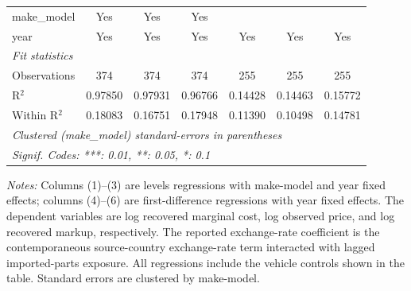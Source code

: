 \begin{table}[htbp]
{\begin{tabular}{lcccccc}
      make\_model               & Yes            & Yes           & Yes             &               &               & \\
      year                      & Yes            & Yes           & Yes             & Yes           & Yes           & Yes\\
      \midrule
      \emph{Fit statistics}\\
      Observations              & 374            & 374           & 374             & 255           & 255           & 255\\
      R$^2$                     & 0.97850        & 0.97931       & 0.96766         & 0.14428       & 0.14463       & 0.15772\\
      Within R$^2$              & 0.18083        & 0.16751       & 0.17948         & 0.11390       & 0.10498       & 0.14781\\
      \midrule \midrule
      \multicolumn{7}{l}{\emph{Clustered (make\_model) standard-errors in parentheses}}\\
      \multicolumn{7}{l}{\emph{Signif. Codes: ***: 0.01, **: 0.05, *: 0.1}}\\
   \end{tabular}%
   }
\vspace{0.25em}
\begin{minipage}{0.96\textwidth}
\footnotesize \textit{Notes:} Columns (1)--(3) are levels regressions with make-model and year fixed effects; columns (4)--(6) are first-difference regressions with year fixed effects. The dependent variables are log recovered marginal cost, log observed price, and log recovered markup, respectively. The reported exchange-rate coefficient is the contemporaneous source-country exchange-rate term interacted with lagged imported-parts exposure. All regressions include the vehicle controls shown in the table. Standard errors are clustered by make-model.
\end{minipage}
\end{table}
